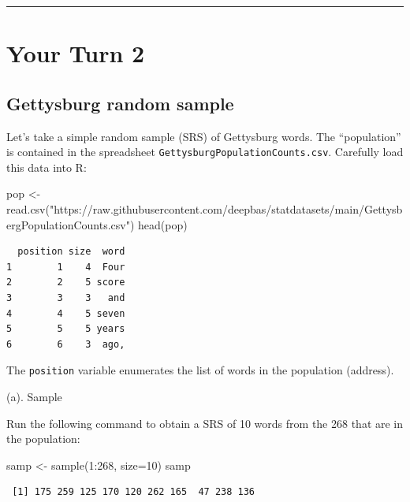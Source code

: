 \documentclass[
]{book}
\newenvironment{Shaded}{\begin{snugshade}}{\end{snugshade}}
\newcommand{\AttributeTok}[1]{\textcolor[rgb]{0.77,0.63,0.00}{#1}}
\newcommand{\DecValTok}[1]{\textcolor[rgb]{0.00,0.00,0.81}{#1}}
\newcommand{\FunctionTok}[1]{\textcolor[rgb]{0.00,0.00,0.00}{#1}}
\newcommand{\NormalTok}[1]{#1}
\newcommand{\OtherTok}[1]{\textcolor[rgb]{0.56,0.35,0.01}{#1}}
\newcommand{\SpecialCharTok}[1]{\textcolor[rgb]{0.00,0.00,0.00}{#1}}
\newcommand{\StringTok}[1]{\textcolor[rgb]{0.31,0.60,0.02}{#1}}
\begin{document}
\begin{center}\rule{0.5\linewidth}{0.5pt}\end{center}

\hypertarget{your-turn-2-1}{%
\section{Your Turn 2}\label{your-turn-2-1}}

\hypertarget{gettysburg-random-sample}{%
\subsection{Gettysburg random sample}\label{gettysburg-random-sample}}

Let's take a simple random sample (SRS) of Gettysburg words. The ``population'' is contained in the
spreadsheet \texttt{GettysburgPopulationCounts.csv}. Carefully load this data into R:

\begin{Shaded}
\begin{Highlighting}[]
\NormalTok{pop }\OtherTok{\textless{}{-}} \FunctionTok{read.csv}\NormalTok{(}\StringTok{"https://raw.githubusercontent.com/deepbas/statdatasets/main/GettysbergPopulationCounts.csv"}\NormalTok{)}
\FunctionTok{head}\NormalTok{(pop)}
\end{Highlighting}
\end{Shaded}

\begin{verbatim}
  position size  word
1        1    4  Four
2        2    5 score
3        3    3   and
4        4    5 seven
5        5    5 years
6        6    3  ago,
\end{verbatim}

The \texttt{position} variable enumerates the list of words in the population (address).

(a). Sample

Run the following command to obtain a SRS of 10 words from the 268 that are in the population:

\begin{Shaded}
\begin{Highlighting}[]
\NormalTok{samp }\OtherTok{\textless{}{-}} \FunctionTok{sample}\NormalTok{(}\DecValTok{1}\SpecialCharTok{:}\DecValTok{268}\NormalTok{, }\AttributeTok{size=}\DecValTok{10}\NormalTok{)}
\NormalTok{samp}
\end{Highlighting}
\end{Shaded}

\begin{verbatim}
 [1] 175 259 125 170 120 262 165  47 238 136
\end{verbatim}
\end{document}

